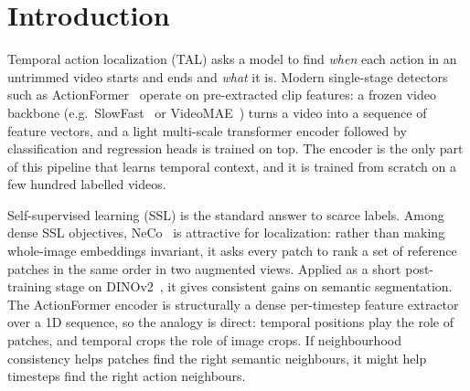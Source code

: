 \documentclass[10pt,a4paper]{article}
\begin{document}
\section{Introduction}

Temporal action localization (TAL) asks a model to find \emph{when} each action in an
untrimmed video starts and ends and \emph{what} it is. Modern single-stage detectors such
as ActionFormer~\cite{zhang2022actionformer} operate on pre-extracted clip features: a
frozen video backbone (e.g.\ SlowFast~\cite{feichtenhofer2019slowfast} or
VideoMAE~\cite{tong2022videomae}) turns a video into a sequence of feature vectors, and a
light multi-scale transformer encoder followed by classification and regression heads is
trained on top. The encoder is the only part of this pipeline that learns temporal
context, and it is trained from scratch on a few hundred labelled videos.

Self-supervised learning (SSL) is the standard answer to scarce labels. Among dense SSL
objectives, NeCo~\cite{pariza2025neco} is attractive for localization: rather than making
whole-image embeddings invariant, it asks every patch to rank a set of reference patches
in the same order in two augmented views. Applied as a short post-training stage on
DINOv2~\cite{oquab2024dinov2}, it gives consistent gains on semantic segmentation. The
ActionFormer encoder is structurally a dense per-timestep feature extractor over a 1D
sequence, so the analogy is direct: temporal positions play the role of patches, and
temporal crops the role of image crops. If neighbourhood consistency helps patches find
the right semantic neighbours, it might help timesteps find the right action neighbours.
\end{document}

